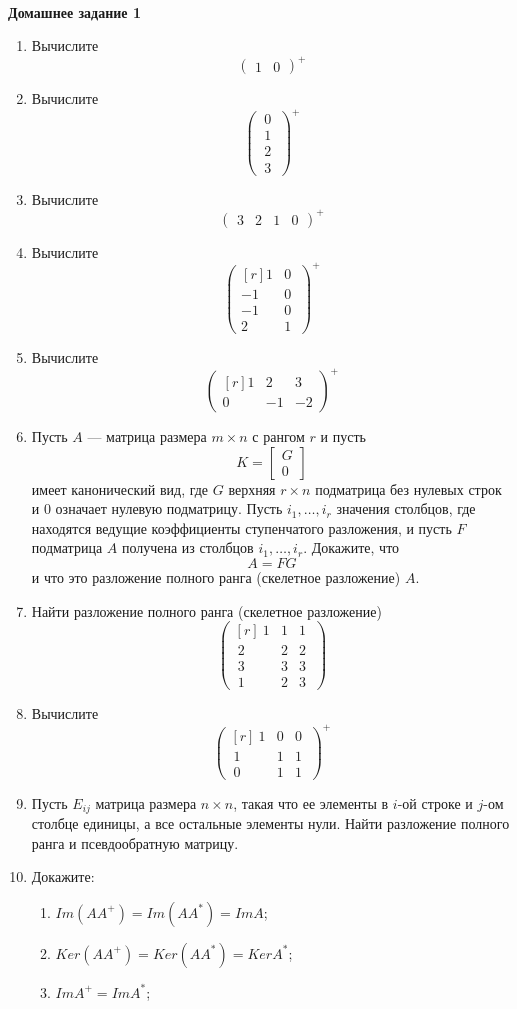 \documentclass[12pt]{article}
\theoremstyle{definition}
\numberwithin{equation}{section}
\begin{document}
\\
\textbf{Домашнее задание 1}\begin{enumerate}
\item Вычислите \[\begin{pmatrix} 1&0\end{pmatrix}^+\]
\item Вычислите \[\begin{pmatrix} ~0~\\~1~\\~2~\\~3~\end{pmatrix}^+\]
\item Вычислите \[\begin{pmatrix} 3&2&1&0 \end{pmatrix}^+\]
\item Вычислите \[\begin{pmatrix}[r] 1&0~\\-1 & 0~\\-1 & 0~\\ 2&1~\end{pmatrix}^+\]
\item Вычислите  \[\begin{pmatrix}[r] 1&2&3\\0 & -1 & -2\end{pmatrix}^+\]
\item Пусть $A $ --- матрица размера $m\times n$
с рангом $r$ и пусть
$$
 K = \left[ \begin{array}{c} G \\ \hline  0\end{array} \right]
$$
имеет канонический вид,
где $G$ верхняя $r\times n$ подматрица без нулевых строк и
$0$ означает нулевую подматрицу. Пусть $i_1, \dots ,i_r$ значения столбцов, где находятся ведущие коэффициенты ступенчатого разложения, и пусть $F$ подматрица $A$ получена из столбцов $i_1,
\dots , i_r$.  Докажите, что
$$
A = FG
$$
 и что это разложение полного ранга (скелетное разложение) $A$.
\item Найти разложение полного ранга (скелетное разложение)
\[\begin{pmatrix}[r] ~1&1&1~\\~2 & 2 & 2~\\~3 & 3 & 3~\\ ~1&2&3~\end{pmatrix}\]
\item Вычислите  \[\begin{pmatrix}[r] ~1&0&0~\\~1 & 1 & 1~\\~0 & 1 & 1~\end{pmatrix}^+\]
\item Пусть $E_{ij}$ матрица размера $n\times n$, такая что ее элементы в $i$-ой строке и $j$-ом столбце единицы, а все остальные элементы нули. Найти разложение полного ранга и псевдообратную матрицу.
\item Докажите:\begin{enumerate}
\item $Im(AA^+) = Im(AA^*) = Im A$;
\item $Ker (AA^+) = Ker (AA^*) = Ker A^*$;
\item $Im A^+ = Im A^*$;
\end{enumerate}
\end{enumerate}
\end{document}
